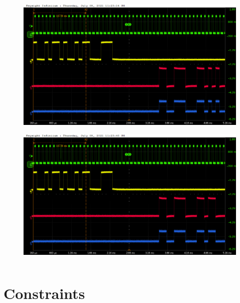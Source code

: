 \documentclass[aspectratio=169]{beamer}
\begin{document}
\begin{frame}
\begin{columns}
		\begin{center}
			\begin{figure}
				\includegraphics[width=0.55 \textwidth]{IMG/probe/09-08-2021_ch07-read53-baselinedac1.png}
				\caption{}
			\end{figure}
			\begin{figure}
				\includegraphics[width=0.55 \textwidth]{IMG/probe/09-08-2021_ch07-read54-baselinedac1.png}
				\caption{}
			\end{figure}	
		\end{center}
	\end{columns}
	\end{frame}

	\section{Constraints}
	
\end{document}
